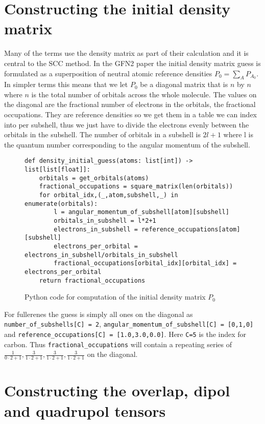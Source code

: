 \section{Constructing the initial density matrix}
Many of the terms use the density matrix as part of their calculation and it is central to the SCC method. In the GFN2 paper the initial density matrix guess is formulated as a superposition of neutral atomic reference densities $P_0 = \sum_{A}P_{A_0}$. In simpler terms this means that we let $P_0$ be a diagonal matrix that is $n$ by $n$ where $n$ is the total number of orbitals across the whole molecule. The values on the diagonal are the fractional number of electrons in the orbitals, the fractional occupations. They are reference densities so we get them in a table we can index into per subshell, thus we just have to divide the electrons evenly between the orbitals in the subshell. The number of orbitals in a subshell is $2l+1$ where l is the quantum number corresponding to the angular momentum of the subshell.
\begin{figure}[H]
\begin{verbatim}
def density_initial_guess(atoms: list[int]) -> list[list[float]]:
    orbitals = get_orbitals(atoms)
    fractional_occupations = square_matrix(len(orbitals))
    for orbital_idx,(_,atom,subshell,_) in enumerate(orbitals):
        l = angular_momentum_of_subshell[atom][subshell] 
        orbitals_in_subshell = l*2+1 
        electrons_in_subshell = reference_occupations[atom][subshell]
        electrons_per_orbital = electrons_in_subshell/orbitals_in_subshell
        fractional_occupations[orbital_idx][orbital_idx] = electrons_per_orbital
    return fractional_occupations
\end{verbatim}
\caption{Python code for computation of the initial density matrix $P_0$}
    \label{lst:orbitals}
\end{figure}
For fullerenes the guess is simply all ones on the diagonal as \verb|number_of_subshells[C] = 2|, \verb|angular_momentum_of_subshell[C] = [0,1,0]| and \verb|reference_occupations[C] = [1.0,3.0,0.0]|.
Here \verb|C=5| is the index for carbon. 
Thus \verb|fractional_occupations| will contain a repeating series of $\frac{1}{0\cdot2+1},\frac{3}{1\cdot2+1},\frac{3}{1\cdot2+1},\frac{3}{1\cdot2+1}$ on the diagonal.

\section{Constructing the overlap, dipol and quadrupol tensors}

